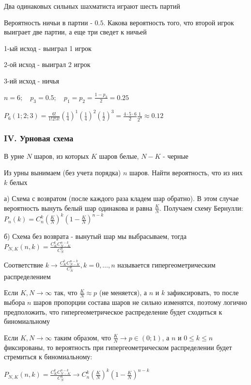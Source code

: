 \documentclass[12pt]{article}
\begin{document}
    \Ex Два одинаковых сильных шахматиста играют шесть партий

    Вероятность ничьи в партии - $0.5$. Какова вероятность того, что второй игрок выиграет две партии, а еще три сведет к ничьей

    1-ый исход - выиграл 1 игрок

    2-ой исход - выиграл 2 игрок

    3-ий исход - ничья

    $n = 6; \quad p_3 = 0.5; \quad p_1 = p_2 = \frac{1 - p_3}{2} = 0.25$

    $P_6(1; 2; 3) = \frac{6!}{1!2!3!} \left(\frac{1}{4}\right)^1 \left(\frac{1}{4}\right)^2 \left(\frac{1}{2}\right)^3 = \frac{4 \cdot 5 \cdot 6}{2} \frac{1}{2^9} \approx 0.12$

    \hypertarget{urnschema}{}

    \subsubsection{IV. Урновая схема}

    В урне $N$ шаров, из которых $K$ шаров белые, $N - K$ - черные

    Из урны вынимаем (без учета порядка) $n$ шаров. Найти вероятность, что из них $k$ белых

    а) Схема с возвратом (после каждого раза кладем шар обратно). В этом случае вероятность вынуть белый шар одинакова и
    равна $\frac{K}{N}$. Получаем схему Бернулли: $P_n(k) = C^k_n \left(\frac{K}{N}\right)^k \left(1 - \frac{K}{N}\right)^{n - k}$

    б) Схема без возврата - вынутый шар мы выбрасываем, тогда
    $P_{N, K} (n, k) = \frac{C^k_K C^{n - k}_{N - K}}{C^n_N}$

    \hypertarget{hypergeometricdistribution}{}

    \Def Соответствие $k \rightarrow \frac{C^k_K C^{n - k}_{N - K}}{C^n_N}, k = 0, \dots, n$ называется гипергеометрическим
    распределением

    \Nota Если $K, N \to \infty$ так, что $\frac{K}{N} \approx p$ (не меняется), а $n$ и $k$ зафиксировать, то после выбора
    $n$ шаров пропорции состава шаров не сильно изменятся, поэтому логично предположить, что гипергеометрическое распределение
    будет сходиться к биномиальному

    \hypertarget{hypergeometricasimptotic}{}

    \begin{MyTheorem}
        \Ths Если $K, N \to \infty$ таким образом, что $\frac{K}{N} \to p \in (0;1)$, а $n$ и $0 \leq k \leq n$ фиксированы, то
        вероятность при гипергеометрическом распределении будет стремиться к биномиальному:

        $P_{N,K} (n, k) = \frac{C^k_K C^{n - k}_{N - K}}{C^n_N} \rightarrow C^k_n \left(\frac{K}{N}\right)^k \left(1 - \frac{K}{N}\right)^{n - k}$
    \end{MyTheorem}
\end{document}
